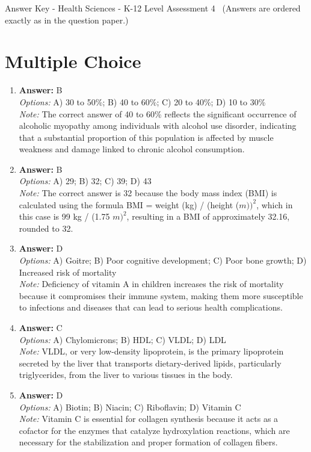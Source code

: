 \documentclass[12pt]{article}
\begin{document}
\begin{center}
Answer Key - Health Sciences - K-12 Level Assessment 4 \
\small (Answers are ordered exactly as in the question paper.)
\end{center}

\section*{Multiple Choice}
\begin{enumerate}[label=\arabic*.]
\item \textbf{Answer:} B
\\ \textit{Options:} A) 30 to 50\%; B) 40 to 60\%; C) 20 to 40\%; D) 10 to 30\%
\\ \textit{Note:} The correct answer of 40 to 60\% reflects the significant occurrence of alcoholic myopathy among individuals with alcohol use disorder, indicating that a substantial proportion of this population is affected by muscle weakness and damage linked to chronic alcohol consumption.
\item \textbf{Answer:} B
\\ \textit{Options:} A) 29; B) 32; C) 39; D) 43
\\ \textit{Note:} The correct answer is 32 because the body mass index (BMI) is calculated using the formula BMI = weight (kg) / (height ($m))^2$, which in this case is 99 kg / (1.75 $m)^2$, resulting in a BMI of approximately 32.16, rounded to 32.
\item \textbf{Answer:} D
\\ \textit{Options:} A) Goitre; B) Poor cognitive development; C) Poor bone growth; D) Increased risk of mortality
\\ \textit{Note:} Deficiency of vitamin A in children increases the risk of mortality because it compromises their immune system, making them more susceptible to infections and diseases that can lead to serious health complications.
\item \textbf{Answer:} C
\\ \textit{Options:} A) Chylomicrons; B) HDL; C) VLDL; D) LDL
\\ \textit{Note:} VLDL, or very low-density lipoprotein, is the primary lipoprotein secreted by the liver that transports dietary-derived lipids, particularly triglycerides, from the liver to various tissues in the body.
\item \textbf{Answer:} D
\\ \textit{Options:} A) Biotin; B) Niacin; C) Riboflavin; D) Vitamin C
\\ \textit{Note:} Vitamin C is essential for collagen synthesis because it acts as a cofactor for the enzymes that catalyze hydroxylation reactions, which are necessary for the stabilization and proper formation of collagen fibers.
\end{enumerate}
\end{document}
